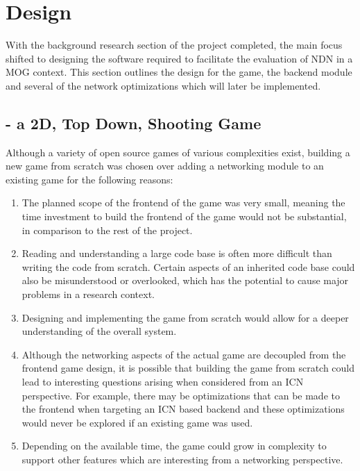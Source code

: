 \chapter{Design}
With the background research section of the project completed, the main focus shifted to designing the software required to facilitate the evaluation of NDN in a MOG context. This section outlines the design for the game, the backend module and several of the network optimizations which will later be implemented.


\section{\game{} - a 2D, Top Down, Shooting Game}
Although a variety of open source games of various complexities exist, building a new game from scratch was chosen over adding a networking module to an existing game for the following reasons:

\begin{enumerate}
    \item The planned scope of the frontend of the game was very small, meaning the time investment to build the frontend of the game would not be substantial, in comparison to the rest of the project.
    \item Reading and understanding a large code base is often more difficult than writing the code from scratch. Certain aspects of an inherited code base could also be misunderstood or overlooked, which has the potential to cause major problems in a research context.
    \item Designing and implementing the game from scratch would allow for a deeper understanding of the overall system.
    \item Although the networking aspects of the actual game are decoupled from the frontend game design, it is possible that building the game from scratch could lead to interesting questions arising when considered from an ICN perspective. For example, there may be optimizations that can be made to the frontend when targeting an ICN based backend and these optimizations would never be explored if an existing game was used.
    \item Depending on the available time, the game could grow in complexity to support other features which are interesting from a networking perspective.
\end{enumerate}

